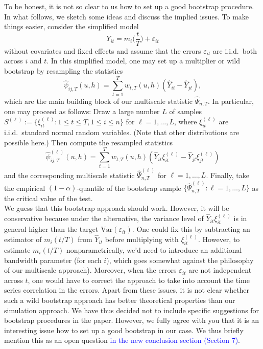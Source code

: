 \documentclass[a4paper,12pt]{article}
\begin{document}
\begin{enumerate}[label=\arabic*.,leftmargin=0.6cm]
To be honest, it is not so clear to us how to set up a good bootstrap procedure. In what follows, we sketch some ideas and discuss the implied issues. To make things easier, consider the simplified model 
\[ Y_{it} = m_i\Big(\frac{t}{T}\Big) + \varepsilon_{it} \]
without covariates and fixed effects and assume that the errors $\varepsilon_{it}$ are i.i.d.\ both across $i$ and $t$. In this simplified model, one may set up a multiplier or wild bootstrap by resampling the statistics
\[ \widehat{\psi}_{ij,T}(u,h) = \sum_{t=1}^T w_{t,T}(u,h) (\widehat{Y}_{it} - \widehat{Y}_{jt}), \]
which are the main building block of our multiscale statistic $\widehat{\Psi}_{n,T}$. In particular, one may proceed as follows: Draw a large number $L$ of samples $S^{(\ell)} := \{\xi_{it}^{(\ell)}: 1 \le t \le T, 1 \le i \le n \}$ for $\ell=1,\ldots,L$, where $\xi_{it}^{(\ell)}$ are i.i.d.\ standard normal random variables. (Note that other distributions are possible here.) Then compute the resampled statistics  
\[ \widehat{\psi}_{ij,T}^{(\ell)}(u,h) = \sum_{t=1}^T w_{t,T}(u,h) (\widehat{Y}_{it} \xi_{it}^{(\ell)} - \widehat{Y}_{jt} \xi_{jt}^{(\ell)}) \]
and the corresponding multiscale statistic $\widehat{\Psi}_{n,T}^{(\ell)}$ for $\ell=1,\ldots,L$. Finally, take the empirical $(1-\alpha)$-quantile of the bootstrap sample $\{ \widehat{\Psi}_{n,T}^{(\ell)}:  \ell=1,\ldots,L \}$ as the critical value of the test. \\
We guess that this bootstrap approach should work. However, it will be conservative because under the alternative, the variance level of $\widehat{Y}_{it} \xi_{it}^{(\ell)}$ is in general higher than the target $\text{Var}(\varepsilon_{it})$. One could fix this by subtracting an estimator of $m_i(t/T)$ from $\widehat{Y}_{it}$ before multiplying with $\xi_{it}^{(\ell)}$. However, to estimate $m_i(t/T)$ nonparametrically, we'd need to introduce an additional bandwidth parameter (for each $i$), which goes somewhat against the philosophy of our multiscale approach). Moreover, when the errors $\varepsilon_{it}$ are not independent across $t$, one would have to correct the approach to take into account the time series correlation in the errors. Apart from these issues, it is not clear whether such a wild bootstrap approach has better theoretical properties than our simulation approach. We have thus decided not to include specific suggestions for bootstrap procedures in the paper. However, we fully agree with you that it is an interesting issue how to set up a good bootstrap in our case. We thus briefly mention this as an open question \textcolor{blue}{in the new conclusion section (Section 7)}. 



\end{enumerate}
\end{document}
